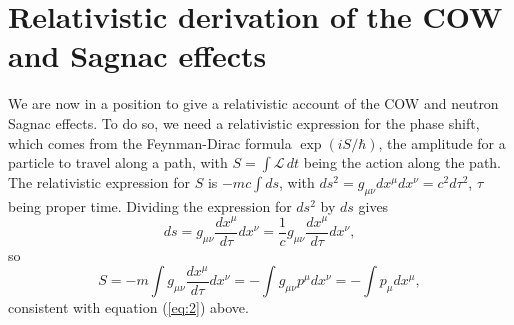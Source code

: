 \documentclass[twocolumn,reprint,amsmath,amssymb]{revtex4}
\begin{document}

\section{Relativistic derivation of the COW and Sagnac effects}
\label{sec:relativistic_derivation}

We are now in a position to give a relativistic account of the COW and neutron
Sagnac effects. To do so, we need a relativistic expression for the phase shift, which comes from the Feynman-Dirac formula $\exp \left({i}S/{\hbar}\right)$, the amplitude for a particle to travel along a path, with $S = \int \mathcal{L}\,dt$ being the action along the path. The relativistic expression for $S$ is $-mc\int ds$, with $ds^2 = g_{\mu\nu}dx^\mu dx^\nu = c^2 d\tau ^2$, $\tau$ being proper time.  Dividing the expression for $ds^2$ by $ds$ gives
\begin{equation}
ds = g_{\mu\nu} \frac{dx^\mu}{d\tau} dx^\nu = \frac{1}{c} g_{\mu\nu} \frac{dx^\mu}{d\tau} dx^\nu,
\end{equation}
so 
\begin{equation}
S = -m \int g_{\mu\nu} \frac{dx^\mu}{d\tau} dx^\nu = -\int g_{\mu\nu} p^\mu dx^\nu = -\int p_\mu dx^\mu,
\end{equation}
consistent with equation (\ref{eq:2}) above.
\end{document}
